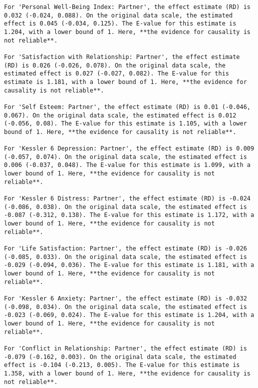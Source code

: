 \documentclass[
  singlecolumn]{article}
\begin{document}
\begin{verbatim}
For 'Personal Well-Being Index: Partner', the effect estimate (RD) is 0.032 (-0.024, 0.088). On the original data scale, the estimated effect is 0.045 (-0.034, 0.125). The E-value for this estimate is 1.204, with a lower bound of 1. Here, **the evidence for causality is not reliable**.

For 'Satisfaction with Relationship: Partner', the effect estimate (RD) is 0.026 (-0.026, 0.078). On the original data scale, the estimated effect is 0.027 (-0.027, 0.082). The E-value for this estimate is 1.181, with a lower bound of 1. Here, **the evidence for causality is not reliable**.

For 'Self Esteem: Partner', the effect estimate (RD) is 0.01 (-0.046, 0.067). On the original data scale, the estimated effect is 0.012 (-0.056, 0.08). The E-value for this estimate is 1.105, with a lower bound of 1. Here, **the evidence for causality is not reliable**.

For 'Kessler 6 Depression: Partner', the effect estimate (RD) is 0.009 (-0.057, 0.074). On the original data scale, the estimated effect is 0.006 (-0.037, 0.048). The E-value for this estimate is 1.099, with a lower bound of 1. Here, **the evidence for causality is not reliable**.

For 'Kessler 6 Distress: Partner', the effect estimate (RD) is -0.024 (-0.086, 0.038). On the original data scale, the estimated effect is -0.087 (-0.312, 0.138). The E-value for this estimate is 1.172, with a lower bound of 1. Here, **the evidence for causality is not reliable**.

For 'Life Satisfaction: Partner', the effect estimate (RD) is -0.026 (-0.085, 0.033). On the original data scale, the estimated effect is -0.029 (-0.094, 0.036). The E-value for this estimate is 1.181, with a lower bound of 1. Here, **the evidence for causality is not reliable**.

For 'Kessler 6 Anxiety: Partner', the effect estimate (RD) is -0.032 (-0.098, 0.034). On the original data scale, the estimated effect is -0.023 (-0.069, 0.024). The E-value for this estimate is 1.204, with a lower bound of 1. Here, **the evidence for causality is not reliable**.

For 'Conflict in Relationship: Partner', the effect estimate (RD) is -0.079 (-0.162, 0.003). On the original data scale, the estimated effect is -0.104 (-0.213, 0.005). The E-value for this estimate is 1.358, with a lower bound of 1. Here, **the evidence for causality is not reliable**.
\end{verbatim}
\end{document}
